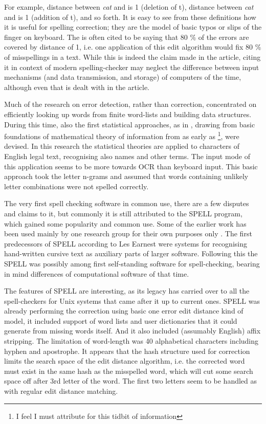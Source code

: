 \documentclass[officiallayout,draft]{unihelcompling}
\newcommand\misspelt{\bgroup\markoverwith
{\textcolor{red}{\lower3.5pt\hbox{\sixly \char58}}}\ULon}
\begin{document}
For example, distance between \emph{cat} and \misspelt{ca} is 1 (deletion of
t), distance between \emph{cat} and \misspelt{catt} is 1 (addition of t), and
so forth.  It is easy to see from these definitions how it is useful for
spelling correction; they are the model of basic typos or slips of the finger
on keyboard. The \cite{damerau1964technique} is often cited to be saying that
80 \% of the errors are covered by distance of 1, i.e. one application of this
edit algorithm would fix 80 \% of misspellings in a text. While this is indeed
the claim made in the article, citing it in context of modern spelling-checker
may neglect the difference between input mechanisms (and data transmission, and
storage) of computers of the time, although even that is dealt with in the
article.

Much of the research on error detection, rather than correction, concentrated
on efficiently looking up words from finite word-lists and building data
structures\cite{}. During this time, also the first statistical approaches, as
in \cite{raviv1967decision}, drawing from basic foundations of mathematical
theory of information from as early as
\cite{shannon1948mathematical}\footnote{I feel I must attribute
\cite{liberman2012noisily} for this tidbit of information}, were devised. In
this research the statistical theories are applied to characters of English
legal text, recognising also names and other terms. The input mode of this
application seems to be more towards OCR than keyboard input. This basic approach took the letter n-grams and assumed that words
containing unlikely letter combinations were not spelled correctly.

The very first spell checking software in common use, there are a few disputes
and claims to it, but commonly it is still attributed to the SPELL
program\cite{gorin1971spell}, which gained some popularity and common use. Some
of the earlier work has been used mainly by one research group for their own
purposes only \cite{earnest2011first,earnest2012first}. The first predecessors
of SPELL according to Les Earnest were systems for recognising hand-written
cursive text as auxiliary parts of larger software. Following this the SPELL
was possibly among first self-standing software for spell-checking, bearing in
mind differences of computational software of that time.

The features of SPELL are interesting, as its legacy has carried over to all
the spell-checkers for Unix systems that came after it up to current ones.
SPELL was already performing the correction using basic one error edit distance
kind of model, it included support of word lists and user dictionaries that it
could generate from missing words itself. And it also included (assumably
English) affix stripping. The limitation of
word-length was 40 alphabetical characters including hyphen and apostrophe. It
appears that the hash structure used for correction limits the search space of
the edit distance algorithm, i.e. the corrected word must exist in the same
hash as the misspelled word, which will cut some search space off after 3rd
letter of the word. The first two letters seem to be handled as with regular
edit distance matching. \cite{gorin1971spell}
\end{document}

